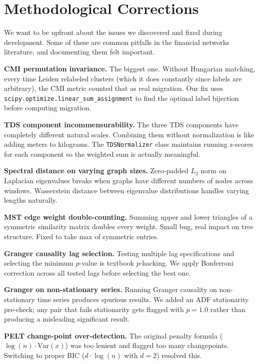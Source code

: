 \documentclass[12pt, letterpaper]{article}
\begin{document}
\section{Methodological Corrections}

We want to be upfront about the issues we discovered and fixed during development. Some of these are common pitfalls in the financial networks literature, and documenting them felt important.

\textbf{CMI permutation invariance.} The biggest one. Without Hungarian matching, every time Leiden relabeled clusters (which it does constantly since labels are arbitrary), the CMI metric counted that as real migration. Our fix uses \texttt{scipy.optimize.linear\_sum\_assignment} to find the optimal label bijection before computing migration.

\textbf{TDS component incommensurability.} The three TDS components have completely different natural scales. Combining them without normalization is like adding meters to kilograms. The \texttt{TDSNormalizer} class maintains running z-scores for each component so the weighted sum is actually meaningful.

\textbf{Spectral distance on varying graph sizes.} Zero-padded $L_2$ norm on Laplacian eigenvalues breaks when graphs have different numbers of nodes across windows. Wasserstein distance between eigenvalue distributions handles varying lengths naturally.

\textbf{MST edge weight double-counting.} Summing upper and lower triangles of a symmetric similarity matrix doubles every weight. Small bug, real impact on tree structure. Fixed to take max of symmetric entries.

\textbf{Granger causality lag selection.} Testing multiple lag specifications and selecting the minimum $p$-value is textbook $p$-hacking. We apply Bonferroni correction across all tested lags before selecting the best one.

\textbf{Granger on non-stationary series.} Running Granger causality on non-stationary time series produces spurious results. We added an ADF stationarity pre-check; any pair that fails stationarity gets flagged with $p=1.0$ rather than producing a misleading significant result.

\textbf{PELT change-point over-detection.} The original penalty formula ($\log(n) \cdot \text{Var}(x)$) was too lenient and flagged too many changepoints. Switching to proper BIC ($d \cdot \log(n)$ with $d=2$) resolved this.
\end{document}
